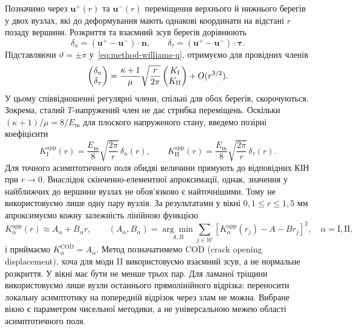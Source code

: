 Позначимо через $\boldsymbol u^+(r)$ та $\boldsymbol u^-(r)$ переміщення верхнього й нижнього берегів у двох вузлах, які до деформування мають однакові координати на відстані $r$ позаду вершини. Розкриття та взаємний зсув берегів дорівнюють
\begin{equation}
 \delta_n=(\boldsymbol u^+-\boldsymbol u^-)\cdot\boldsymbol n,\qquad
 \delta_\tau=(\boldsymbol u^+-\boldsymbol u^-)\cdot\boldsymbol\tau.
 \label{eq:method-cod-jumps}
\end{equation}
Підставляючи $\vartheta=\pm\pi$ у~\eqref{eq:method-williams-u}, отримуємо для провідних членів
\begin{equation}
 \begin{pmatrix}\delta_n\\\delta_\tau\end{pmatrix}
 =
 \frac{\kappa+1}{\mu}\sqrt{\frac{r}{2\pi}}
 \begin{pmatrix}K_{\mathrm{I}}\\K_{\mathrm{II}}\end{pmatrix}
 +O(r^{3/2}).
 \label{eq:method-cod-leading}
\end{equation}
У цьому співвідношенні регулярні члени, спільні для обох берегів, скорочуються. Зокрема, сталий $T$-напружений член не дає стрибка переміщень. Оскільки $(\kappa+1)/\mu=8/E_{\mathrm m}$ для плоского напруженого стану, введемо позірні коефіцієнти
\begin{equation}
 K_{\mathrm I}^{\mathrm{app}}(r)=\frac{E_{\mathrm m}}8
 \sqrt{\frac{2\pi}{r}}\,\delta_n(r),\qquad
 K_{\mathrm {II}}^{\mathrm{app}}(r)=\frac{E_{\mathrm m}}8
 \sqrt{\frac{2\pi}{r}}\,\delta_\tau(r).
 \label{eq:method-cod-app}
\end{equation}
Для точного асимптотичного поля обидві величини прямують до відповідних КІН при $r\to0$. Внаслідок скінченно-елементної апроксимації, однак, значення у найближчих до вершини вузлах не обов'язково є найточнішими. Тому не використовуємо лише одну пару вузлів. За результатами у вікні $0{,}1\le r\le1{,}5$ мм апроксимуємо кожну залежність лінійною функцією
\begin{equation}
 K_\alpha^{\mathrm{app}}(r)\approx A_\alpha+B_\alpha r,\qquad
 (A_\alpha,B_\alpha)=\underset{A,B}{\arg\min}
 \sum_{j\in\mathcal W}
 [K_\alpha^{\mathrm{app}}(r_j)-A-Br_j]^2,
 \quad \alpha=\mathrm I,\mathrm{II},
 \label{eq:method-cod-fit}
\end{equation}
і приймаємо $K_\alpha^{\mathrm{COD}}=A_\alpha$. Метод позначатимемо COD (crack opening displacement), хоча для моди II використовуємо взаємний зсув, а не нормальне розкриття. У вікні має бути не менше трьох пар. Для ламаної тріщини використовуємо лише вузли останнього прямолінійного відрізка: переносити локальну асимптотику на попередній відрізок через злам не можна. Вибране вікно є параметром чисельної методики, а не універсальною межею області асимптотичного поля.

